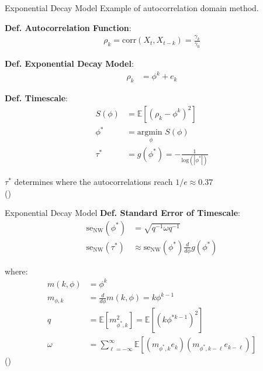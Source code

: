 \documentclass[12pt]{beamer}
\begin{document}
\begin{frame}{Exponential Decay Model}
\footnotesize
Example of autocorrelation domain method.
\vspace{0.25cm}

\textbf{Def. Autocorrelation Function}:
\begin{align}
    \rho_k = \text{corr}(X_t, X_{t-k}) = \frac{\gamma_k}{\gamma_0}
\end{align}

\textbf{Def. Exponential Decay Model}:
\begin{align} \label{eq:acf}
\rho_k &= \phi^k + e_k
\end{align}

\textbf{Def. Timescale}:
\begin{align}
    S(\phi) &= \mathbb{E}[(\rho_k - \phi^k)^2]\\
    \phi^* &= \underset{\phi}{\text{argmin }} S(\phi)\\
    \tau^* &= g(\phi^*) = -\frac{1}{\text{log}(|\phi^*|)}
\end{align}

$\tau^*$ determines where the autocorrelations reach $1/\textit{e} \approx 0.37$\\
(\cite{murray_hierarchy_2014})

\end{frame}

\begin{frame}{Exponential Decay Model}
\footnotesize
\textbf{Def. Standard Error of Timescale}:
\begin{align}
    \text{se}_\text{NW}(\phi^*) &= \sqrt{q^{-1} \omega q^{-1}}\\
    \text{se}_\text{NW}(\tau^*) &\approx \text{se}_\text{NW}(\phi^*) \frac{d}{d\phi}g(\phi^*)
\end{align}

where:
\begin{align*}
    m(k, \phi) &= \phi^k\\
    m_{\phi, k} &= \frac{d}{d\phi} m(k, \phi) = k \phi ^{k-1}\\
    q &= \mathbb{E}[m_{\phi^*, k}^2] = \mathbb{E}[(k \phi^{*k-1})^2]\\
    \omega &= \sum_{\ell=-\infty}^{\infty} \mathbb{E}[(m_{\phi^*, k} e_{k})(m_{\phi^*, k-\ell} e_{k-\ell})]
\end{align*}
(\cite{newey_simple_1987})
\end{frame}

\end{document}
